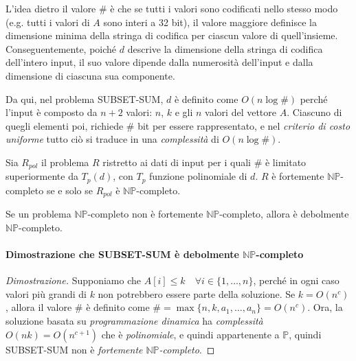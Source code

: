 \noindent
L'idea dietro il valore $\#$ è che se tutti i valori sono codificati nello
stesso modo (e.g. tutti i valori di $A$ sono interi a 32 bit), il valore maggiore
definisce la dimensione minima della stringa di codifica per ciascun valore di
quell'insieme. Conseguentemente, poiché $d$ descrive la dimensione della stringa
di codifica dell'intero input, il suo valore dipende dalla numerosità dell'input
e dalla dimensione di ciascuna sua componente.

Da qui,  nel problema SUBSET-SUM, $d$ è definito come $O(n\log\#)$ perché
l'input è composto da $n+2$ valori: $n$, $k$ e gli $n$ valori del vettore $A$.
Ciascuno di quegli elementi poi, richiede $\#$ bit per essere rappresentato, e
nel \emph{criterio di costo uniforme} tutto ciò si traduce in una
\emph{complessità} di $O(n\log\#)$.

\begin{definition}
    Sia $R_{pol}$ il problema $R$ ristretto ai dati di input per i quali $\#$
    è limitato superiormente da $T_p(d)$, con $T_p$ funzione polinomiale di $d$.
    $R$ è fortemente $\mathbb{NP}$-completo se e solo se $R_{pol}$ è
    $\mathbb{NP}$-completo.
\end{definition}

\begin{definition}
    Se un problema $\mathbb{NP}$-completo non è fortemente $\mathbb{NP}$-completo,
    allora è debolmente $\mathbb{NP}$-completo.
\end{definition}

\paragraph{Dimostrazione che SUBSET-SUM è debolmente $\mathbb{NP}$-completo}
\begin{proof}[Dimostrazione]
    Supponiamo che $A[i]\leq k\quad\forall i\in\{1,\dots,n\}$, perché in ogni
    caso valori più grandi di $k$ non potrebbero essere parte della soluzione.
    Se $k=O(n^c)$, allora il valore $\#$ è definito come $\#=\max\{n, k, a_1,
    \dots, a_n\}=O(n^c)$. Ora, la soluzione basata su \emph{programmazione
    dinamica} ha \emph{complessità} $O(nk)=O(n^{c+1})$ che è \emph{polinomiale},
    e quindi appartenente a $\mathbb{P}$, quindi SUBSET-SUM non è \emph{fortemente
    $\mathbb{NP}$-completo}.
\end{proof}

